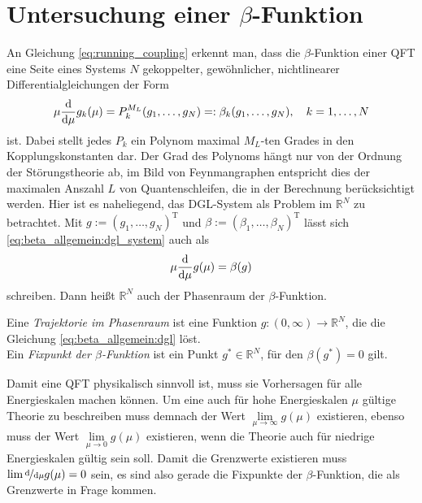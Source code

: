 \clearpage
\section{Untersuchung einer $\beta$-Funktion}


  An Gleichung \ref{eq:running_coupling} erkennt man, dass die $\beta$-Funktion einer 
  QFT eine Seite eines Systems $N$ gekoppelter, gewöhnlicher, nichtlinearer 
  Differentialgleichungen der Form 
  \begin{equation}
   \mu \frac{\text{d}}{\text{d} \mu} g_k (\mu)  = P_k^{M_L}(g_1,\ldots, g_N)=:\beta_k(g_1,\ldots,g_N) 
   , \quad k=1,\ldots,N \label{eq:beta_allgemein:dgl_system}
  \end{equation}
  ist. Dabei stellt jedes $P_k$ ein Polynom maximal $M_L$-ten Grades in den Kopplungskonstanten 
  dar. Der Grad des Polynoms hängt nur von der Ordnung der Störungstheorie ab, im Bild von 
  Feynmangraphen entspricht dies der maximalen Anszahl $L$ von Quantenschleifen, die in 
  der Berechnung berücksichtigt werden. Hier ist es naheliegend, das DGL-System als Problem 
  im $\mathbb{R}^N$ zu betrachtet. Mit $g:=(g_1,\ldots,g_N)^\text{T}$ und 
  $\beta:=(\beta_1,\ldots,\beta_N)^\text{T}$ lässt sich \eqref{eq:beta_allgemein:dgl_system} 
  auch als
  \begin{equation}
   \mu \frac{\text{d}}{\text{d} \mu} g(\mu)=\beta(g) \label{eq:beta_allgemein:dgl}
  \end{equation}
  schreiben. Dann heißt $\mathbb{R}^N$ auch der Phasenraum der $\beta$-Funktion.
  \begin{definition}
  Eine \textit{Trajektorie im Phasenraum} ist eine Funktion $g:(0,\infty)\rightarrow \mathbb{R}^N$, 
  die die Gleichung \eqref{eq:beta_allgemein:dgl} löst.\\
  Ein \textit{Fixpunkt der $\beta$-Funktion} ist ein Punkt $g^*\in \mathbb{R}^N$, für den
   $\beta(g^*)=0$ gilt.
  \end{definition}
  Damit eine QFT physikalisch sinnvoll ist, muss sie Vorhersagen für alle Energieskalen machen 
  können. Um eine auch für hohe Energieskalen $\mu$ gültige Theorie zu beschreiben muss demnach 
  der Wert $\lim\limits_{\mu\to\infty} g(\mu)$ existieren, ebenso muss der Wert $\lim\limits_{
  \mu\to 0}g(\mu)$ existieren, wenn die Theorie auch für niedrige Energieskalen gültig sein soll. 
  Damit die Grenzwerte existieren muss $\lim\nicefrac{\text{d} }{\text{d} \mu} g(\mu)
  =0$ sein, es sind also gerade die Fixpunkte der $\beta$-Funktion, die als Grenzwerte 
  in Frage kommen.
  
